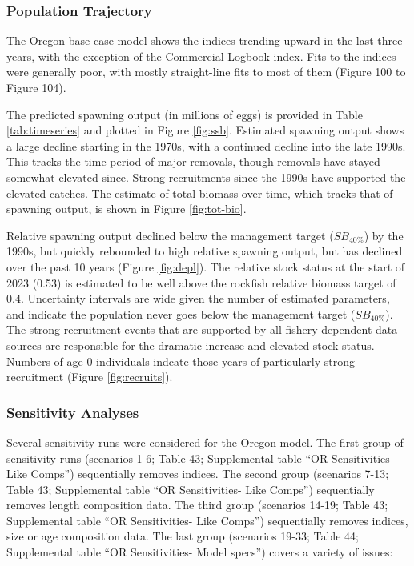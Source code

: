 \documentclass[11pt,
  english,
  letterpaper,
]{article}
\begin{document}
\hypertarget{population-trajectory}{%
\subsubsection{Population Trajectory}\label{population-trajectory}}

The Oregon base case model shows the indices trending upward in the last three years, with the exception of the Commercial Logbook index. Fits to the indices were generally poor, with mostly straight-line fits to most of them (Figure 100 to Figure 104).

The predicted spawning output (in millions of eggs) is provided in Table \ref{tab:timeseries} and plotted in Figure \ref{fig:ssb}. Estimated spawning output shows a large decline starting in the 1970s, with a continued decline into the late 1990s. This tracks the time period of major removals, though removals have stayed somewhat elevated since. Strong recruitments since the 1990s have supported the elevated catches. The estimate of total biomass over time, which tracks that of spawning output, is shown in Figure \ref{fig:tot-bio}.

Relative spawning output declined below the management target (\(SB_{40\%}\)) by the 1990s, but quickly rebounded to high relative spawning output, but has declined over the past 10 years (Figure \ref{fig:depl}). The relative stock status at the start of 2023 (0.53) is estimated to be well above the rockfish relative biomass target of 0.4. Uncertainty intervals are wide given the number of estimated parameters, and indicate the population never goes below the management target (\(SB_{40\%}\)). The strong recruitment events that are supported by all fishery-dependent data sources are responsible for the dramatic increase and elevated stock status. Numbers of age-0 individuals indcate those years of particularly strong recruitment (Figure \ref{fig:recruits}).

\hypertarget{sensitivity-analyses}{%
\subsubsection{Sensitivity Analyses}\label{sensitivity-analyses}}

Several sensitivity runs were considered for the Oregon model. The first group of sensitivity runs (scenarios 1-6; Table 43; Supplemental table ``OR Sensitivities- Like Comps'') sequentially removes indices. The second group (scenarios 7-13; Table 43; Supplemental table ``OR Sensitivities- Like Comps'') sequentially removes length composition data. The third group (scenarios 14-19; Table 43; Supplemental table ``OR Sensitivities- Like Comps'') sequentially removes indices, size or age composition data. The last group (scenarios 19-33; Table 44; Supplemental table ``OR Sensitivities- Model specs'') covers a variety of issues:
\end{document}
